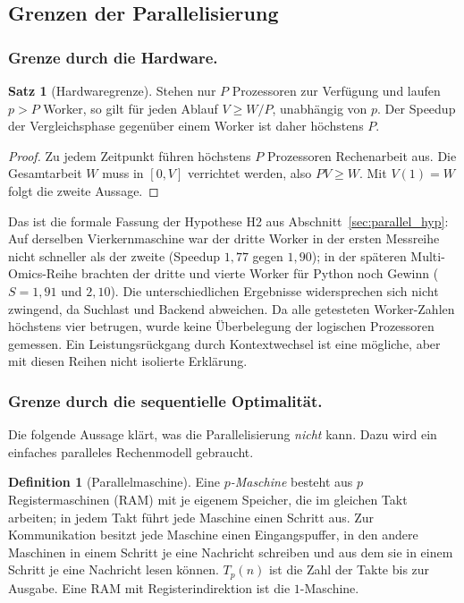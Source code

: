 \documentclass[a4paper,12pt, twoside]{report}
\theoremstyle{definition}
\newtheorem{definition}{Definition}
\newtheorem{satz}{Satz}
\begin{document}
\subsection{Grenzen der Parallelisierung}
\label{sec:p910_grenzen}

\subsubsection{Grenze durch die Hardware.}

\begin{satz}[Hardwaregrenze]
\label{satz:p910_hardware}
Stehen nur $P$ Prozessoren zur Verfügung und laufen $p>P$ Worker, so gilt für jeden Ablauf $V\ge W/P$, unabhängig von $p$. Der Speedup der Vergleichsphase gegenüber einem Worker ist daher höchstens $P$.
\end{satz}

\begin{proof}
Zu jedem Zeitpunkt führen höchstens $P$ Prozessoren Rechenarbeit aus. Die Gesamtarbeit $W$ muss in $[0,V]$ verrichtet werden, also $PV\ge W$. Mit $V(1)=W$ folgt die zweite Aussage.
\end{proof}

Das ist die formale Fassung der Hypothese H2 aus Abschnitt~\ref{sec:parallel_hyp}: Auf derselben Vierkernmaschine war der dritte Worker in der ersten Messreihe nicht schneller als der zweite (Speedup $1{,}77$ gegen $1{,}90$); in der späteren Multi-Omics-Reihe brachten der dritte und vierte Worker für Python noch Gewinn ($S=1{,}91$ und $2{,}10$). Die unterschiedlichen Ergebnisse widersprechen sich nicht zwingend, da Suchlast und Backend abweichen. Da alle getesteten Worker-Zahlen höchstens vier betrugen, wurde keine Überbelegung der logischen Prozessoren gemessen. Ein Leistungsrückgang durch Kontextwechsel ist eine mögliche, aber mit diesen Reihen nicht isolierte Erklärung.

\subsubsection{Grenze durch die sequentielle Optimalität.}
Die folgende Aussage klärt, was die Parallelisierung \emph{nicht} kann. Dazu wird ein einfaches paralleles Rechenmodell gebraucht.

\begin{definition}[Parallelmaschine]
\label{def:p910_pram}
Eine \emph{$p$-Maschine} besteht aus $p$ Registermaschinen (RAM) mit je eigenem Speicher, die im gleichen Takt arbeiten; in jedem Takt führt jede Maschine einen Schritt aus. Zur Kommunikation besitzt jede Maschine einen Eingangspuffer, in den andere Maschinen in einem Schritt je eine Nachricht schreiben und aus dem sie in einem Schritt je eine Nachricht lesen können. $T_p(n)$ ist die Zahl der Takte bis zur Ausgabe. Eine RAM mit Registerindirektion ist die $1$-Maschine.
\end{definition}
\end{document}
